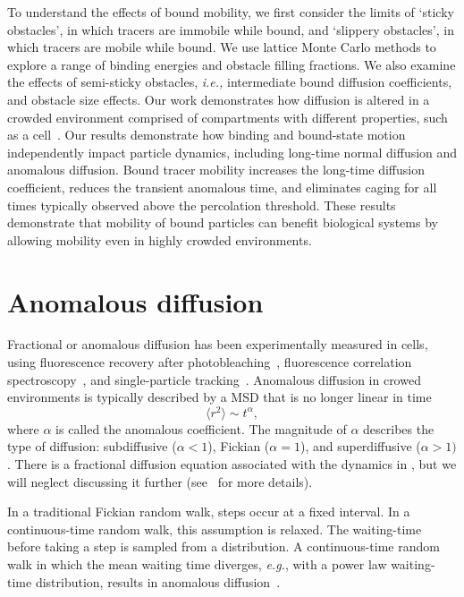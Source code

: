To understand the effects of bound mobility, we first consider the limits of
`sticky obstacles', in which tracers are immobile while bound, and `slippery
obstacles', in which tracers are mobile while bound.  We use lattice Monte Carlo
methods to explore a range of binding energies and obstacle filling fractions.  We
also examine the effects of semi-sticky obstacles, \textit{i.e.,} intermediate
bound diffusion coefficients, and obstacle size effects. Our work demonstrates
how diffusion is altered in a crowded environment comprised of compartments with
different properties, such as a cell~\cite{berry_monte_02}.  Our results
demonstrate how binding and bound-state motion independently impact particle
dynamics, including long-time normal diffusion and anomalous diffusion.  Bound
tracer mobility increases the long-time diffusion coefficient, reduces the
transient anomalous time, and eliminates caging for all times typically observed
above the percolation threshold. These results demonstrate that mobility of
bound particles can benefit biological systems by allowing mobility even in
highly crowded environments.

\section{Anomalous diffusion}
Fractional  or anomalous diffusion has been experimentally measured in cells,
using fluorescence recovery after photobleaching~\cite{feder_constrained_96},
fluorescence correlation spectroscopy~\cite{weiss_anomalous_04,
  banks_anomalous_05}, and single-particle tracking~\cite{ghosh_automated_94}.
Anomalous diffusion in crowed environments is typically described by a MSD that
is no longer linear in time~\cite{metzler_random_00}
%
\begin{equation}
  \label{eqn:msd_anom}
  \langle r ^ 2 \rangle \sim t ^ {\alpha},
\end{equation}
%
where $\alpha$ is called the anomalous coefficient. The magnitude of $\alpha$
describes the type of diffusion: subdiffusive ($\alpha < 1$), Fickian
($\alpha=1$), and superdiffusive ($\alpha > 1)$. There is a fractional diffusion
equation associated with the dynamics in , but we will
neglect discussing it further (see~\cite{metzler_random_00,
  sokolov_fractional_02} for more details).
  
In a traditional Fickian random walk, steps occur at a fixed interval.  In a
continuous-time random walk, this assumption is relaxed. The waiting-time before
taking a step is sampled from a distribution. A continuous-time random walk in
which the mean waiting time diverges, \textit{e.g.}, with a power law
waiting-time distribution, results in anomalous
diffusion~\cite{metzler_random_00, sokolov_fractional_02}. 

